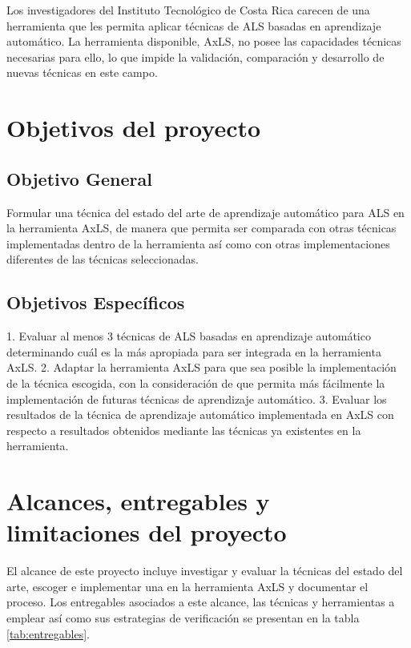 Los investigadores del Instituto Tecnológico de Costa Rica carecen de una
herramienta que les permita aplicar técnicas de ALS basadas en aprendizaje
automático. La herramienta disponible, AxLS, no posee las capacidades técnicas
necesarias para ello, lo que impide la validación, comparación y desarrollo de
nuevas técnicas en este campo.

\section{Objetivos del proyecto}

\subsection{Objetivo General}

Formular una técnica del estado del arte de aprendizaje automático para ALS en la herramienta AxLS, de manera que permita ser comparada con otras técnicas implementadas dentro de la herramienta así como con otras implementaciones diferentes de las técnicas seleccionadas.

\subsection{Objetivos Específicos}

1. Evaluar al menos 3 técnicas de ALS basadas en aprendizaje automático
determinando cuál es la más apropiada para ser integrada en la herramienta
AxLS.
2. Adaptar la herramienta AxLS para que sea posible la implementación de la
técnica escogida, con la consideración de que permita más fácilmente la
implementación de futuras técnicas de aprendizaje automático.
3. Evaluar los resultados de la técnica de aprendizaje automático implementada
en AxLS con respecto a resultados obtenidos mediante las técnicas ya
existentes en la herramienta.

\section{Alcances, entregables y limitaciones del proyecto}

El alcance de este proyecto incluye investigar y evaluar la técnicas del estado
del arte, escoger e implementar una en la herramienta AxLS y documentar el
proceso. Los entregables asociados a este alcance, las técnicas y herramientas a emplear así
como sus estrategias de verificación se presentan en la tabla \ref{tab:entregables}.

